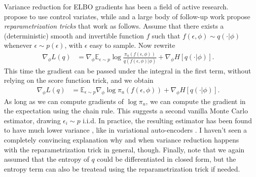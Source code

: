 Variance reduction for ELBO gradients has been a field of active research.
\cite{PaBlJo12} propose to use control variates, while \cite{KiWe14} and a large body of follow-up work propose \emph{reparametrization tricks} that work as follows. 
Assume that there exists a (deterministic) smooth and invertible function $f$ such that $f(\epsilon,\phi)\sim q(\cdot\vert\phi)$ whenever $\epsilon\sim p(\epsilon)$, with $\epsilon$ easy to sample.
Now rewrite 
\begin{align*}
  \nabla_\phi L(q) 
  &= \nabla_\phi \mathbb{E}_{\epsilon\sim p} \log \frac{\pi_u(f(\epsilon,\phi))}{q(f(\epsilon,\phi)\vert\phi)}+ \nabla_\phi H[q(\cdot\vert\phi)].
\end{align*}
This time the gradient can be passed under the integral in the first term, without relying on the score function trick, and we obtain
\begin{align*}
  \nabla_\phi L(q) 
  &= \mathbb{E}_{\epsilon\sim p} \nabla_\phi \log \pi_u(f(\epsilon,\phi)) + \nabla_\phi H[q(\cdot\vert\phi)].
\end{align*}
As long as we can compute gradients of $\log\pi_u$, we can compute the gradient in the expectation using the chain rule. 
This suggests a second vanilla Monte Carlo estimator, drawing $\epsilon_i\sim p$ i.i.d. 
In practice, the resulting estimator has been found to have much lower variance \citep{ReMoWi14}, like in variational auto-encoders \citep{KiWe14}. 
I haven't seen a completely convincing explanation why and when variance reduction happens with the reparametrization trick in general, though.  
Finally, note that we again assumed that the entropy of $q$ could be differentiated in closed form, but the entropy term can also be treatead using the reparametrization trick if needed. 

